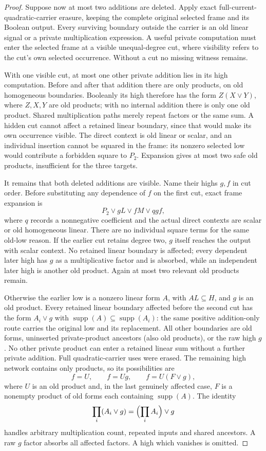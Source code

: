\documentclass[11pt]{article}
\newcommand{\supp}{\operatorname{supp}}
\theoremstyle{definition}
\theoremstyle{remark}
\begin{document}
\begin{proof}
Suppose now at most two additions are deleted. Apply exact full-current-quadratic-carrier erasure, keeping the complete original selected frame and its Boolean output. Every surviving boundary outside the carrier is an old linear signal or a private multiplication expression. A useful private computation must enter the selected frame at a visible unequal-degree cut, where visibility refers to the cut's own selected occurrence. Without a cut no missing witness remains.

With one visible cut, at most one other private addition lies in its high computation. Before and after that addition there are only products, on old homogeneous boundaries. Booleanly its high therefore has the form $Z(X\vee Y)$, where $Z,X,Y$ are old products; with no internal addition there is only one old product. Shared multiplication paths merely repeat factors or the same sum. A hidden cut cannot affect a retained linear boundary, since that would make its own occurrence visible. The direct context is old linear or scalar, and an individual insertion cannot be squared in the frame: its nonzero selected low would contribute a forbidden square to $P_2$. Expansion gives at most two safe old products, insufficient for the three targets.

It remains that both deleted additions are visible. Name their highs $g,f$ in cut order. Before substituting any dependence of $f$ on the first cut, exact frame expansion is
\[
 P_2\vee gL\vee fM\vee qgf,
\]
where $q$ records a nonnegative coefficient and the actual direct contexts are scalar or old homogeneous linear. There are no individual square terms for the same old-low reason. If the earlier cut retains degree two, $g$ itself reaches the output with scalar context. No retained linear boundary is affected; every dependent later high has $g$ as a multiplicative factor and is absorbed, while an independent later high is another old product. Again at most two relevant old products remain.

Otherwise the earlier low is a nonzero linear form $A$, with $AL\subseteq H$, and $g$ is an old product. Every retained linear boundary affected before the second cut has the form $A_i\vee g$ with $\supp(A)\subseteq\supp(A_i)$: the same positive addition-only route carries the original low and its replacement. All other boundaries are old forms, uninserted private-product ancestors (also old products), or the raw high $g$. No other private product can enter a retained linear sum without a further private addition. Full quadratic-carrier uses were erased. The remaining high network contains only products, so its possibilities are
\[
 f=U,\qquad f=Ug,\qquad f=U(F\vee g),
\]
where $U$ is an old product and, in the last genuinely affected case, $F$ is a nonempty product of old forms each containing $\supp(A)$. The identity
\[
 \prod_i(A_i\vee g)=\Bigl(\prod_i A_i\Bigr)\vee g
\]
handles arbitrary multiplication count, repeated inputs and shared ancestors. A raw $g$ factor absorbs all affected factors. A high which vanishes is omitted.


\end{proof}
\end{document}

